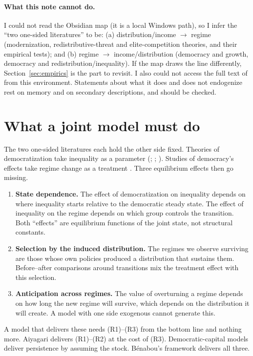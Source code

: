 \documentclass[11pt]{article}
\theoremstyle{remark}
\begin{document}
\paragraph{What this note cannot do.}  I could not read the Obsidian map (it is a local Windows path), so I infer the ``two one-sided literatures'' to be: (a) distribution/income $\to$ regime (modernization, redistributive-threat and elite-competition theories, and their empirical tests); and (b) regime $\to$ income/distribution (democracy and growth, democracy and redistribution/inequality).  If the map draws the line differently, Section~\ref{sec:empirics} is the part to revisit.  I also could not access the full text of \citet{Benabou2000} from this environment.  Statements about what it does and does not endogenize rest on memory and on secondary descriptions, and should be checked.

\section{What a joint model must do}\label{sec:requirements}

The two one-sided literatures each hold the other side fixed.  Theories of democratization take inequality as a parameter (\citealp{AcemogluRobinson2000,AcemogluRobinson2001,AcemogluRobinson2006}; \citealp{Boix2003}; \citealp{AnsellSamuels2014}).  Studies of democracy's effects take regime change as a treatment \citep{AcemogluEtAl2015Handbook,AcemogluEtAl2019JPE}.  Three equilibrium effects then go missing.
\begin{enumerate}
\item \textbf{State dependence.}  The effect of democratization on inequality depends on where inequality starts relative to the democratic steady state.  The effect of inequality on the regime depends on which group controls the transition.  Both ``effects'' are equilibrium functions of the joint state, not structural constants.
\item \textbf{Selection by the induced distribution.}  The regimes we observe surviving are those whose own policies produced a distribution that sustains them.  Before--after comparisons around transitions mix the treatment effect with this selection.
\item \textbf{Anticipation across regimes.}  The value of overturning a regime depends on how long the new regime will survive, which depends on the distribution it will create.  A model with one side exogenous cannot generate this.
\end{enumerate}
A model that delivers these needs (R1)--(R3) from the bottom line and nothing more.  Aiyagari delivers (R1)--(R2) at the cost of (R3).  Democratic-capital models deliver persistence by assuming the stock.  B\'enabou's framework delivers all three.
\end{document}
